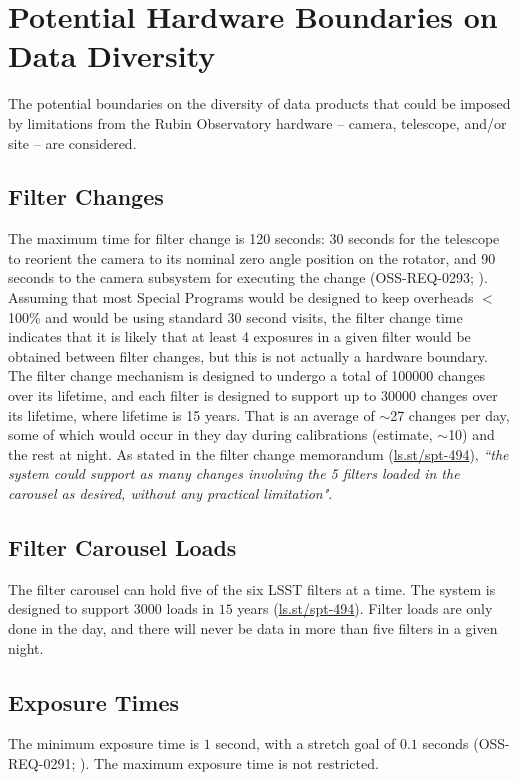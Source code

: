 \section{Potential Hardware Boundaries on Data Diversity}\label{sec:hardbounds}

The potential boundaries on the diversity of data products that could be imposed by limitations from the Rubin Observatory hardware -- camera, telescope, and/or site -- are considered.

\subsection{Filter Changes}
The maximum time for filter change is 120 seconds: 30 seconds for the telescope to reorient the camera to its nominal zero angle position on the rotator, and 90 seconds to the camera subsystem for executing the change (OSS-REQ-0293; ).
Assuming that most Special Programs would be designed to keep overheads $<$100\% and would be using standard 30 second visits, the filter change time indicates that it is likely that at least 4 exposures in a given filter would be obtained between filter changes, but this is not actually a hardware boundary. 
The filter change mechanism is designed to undergo a total of 100000 changes over its lifetime, and each filter is designed to support up to 30000 changes over its lifetime, where lifetime is 15 years.
That is an average of $\sim$27 changes per day, some of which would occur in they day during calibrations (estimate, $\sim$10) and the rest at night.
As stated in the filter change memorandum (\url{ls.st/spt-494}), {\it ``the system could support as many changes involving the 5 filters loaded in the carousel as desired, without any practical limitation"}.

\subsection{Filter Carousel Loads}
The filter carousel can hold five of the six LSST filters at a time.
The system is designed to support $3000$ loads in $15$ years (\url{ls.st/spt-494}).
Filter loads are only done in the day, and there will never be data in more than five filters in a given night.

\subsection{Exposure Times}
The minimum exposure time is $1$ second, with a stretch goal of $0.1$ seconds (OSS-REQ-0291; ).
The maximum exposure time is not restricted.

